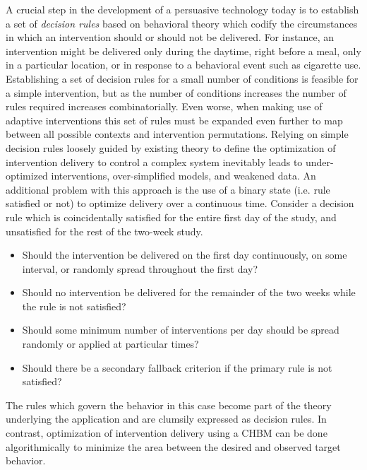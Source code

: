 \documentclass[runningheads,a4paper]{llncs}
\begin{document}
A crucial step in the development of a persuasive technology today is to establish a set of \emph{decision rules} based on behavioral theory which codify the circumstances in which an intervention should or should not be delivered.
For instance, an intervention might be delivered only during the daytime, right before a meal, only in a particular location, or in response to a behavioral event such as cigarette use.
Establishing a set of decision rules for a small number of conditions is feasible for a simple intervention, but as the number of conditions increases the number of rules required increases combinatorially.
Even worse, when making use of adaptive interventions this set of rules must be expanded even further to map between all possible contexts and intervention permutations.
Relying on simple decision rules loosely guided by existing theory to define the optimization of intervention delivery to control a complex system inevitably leads to under-optimized interventions, over-simplified models, and weakened data.
An additional problem with this approach is the use of a binary state (i.e. rule satisfied or not) to optimize delivery over a continuous time.
Consider a decision rule which is coincidentally satisfied for the entire first day of the study, and unsatisfied for the rest of the two-week study.

\begin{itemize}
    \item Should the intervention be delivered on the first day continuously, on some interval, or randomly spread throughout the first day?
    \item Should no intervention be delivered for the remainder of the two weeks while the rule is not satisfied?
    \item Should some minimum number of interventions per day should be spread randomly or applied at particular times?
    \item Should there be a secondary fallback criterion if the primary rule is not satisfied?
\end{itemize}

The rules which govern the behavior in this case become part of the theory underlying the application and are clumsily expressed as decision rules.
In contrast, optimization of intervention delivery using a CHBM can be done algorithmically to minimize the area between the desired and observed target behavior.
\end{document}
